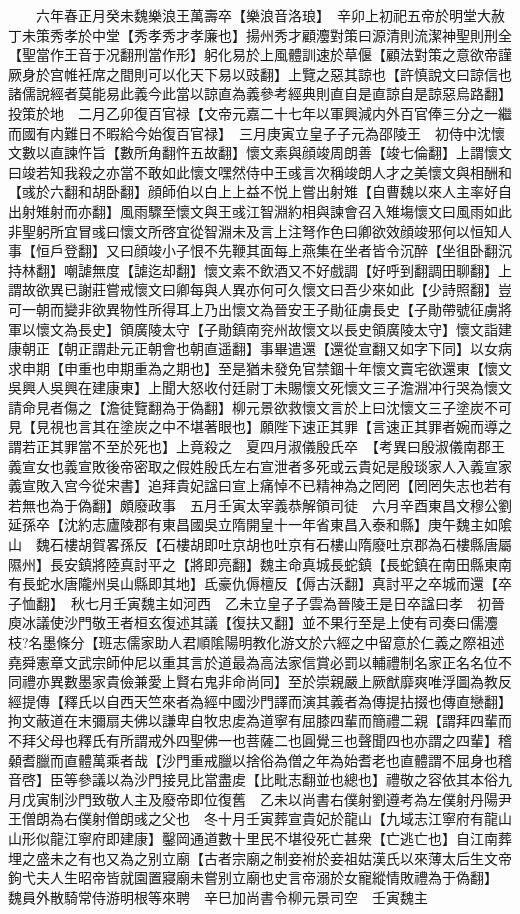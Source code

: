 　　六年春正月癸未魏樂浪王萬壽卒【樂浪音洛琅】　辛卯上初祀五帝於明堂大赦　丁未策秀孝於中堂【秀孝秀才孝廉也】揚州秀才顧灋對策曰源清則流潔神聖則刑全【聖當作王音于况翻刑當作形】躬化易於上風體訓速於草偃【顧法對策之意欲帝謹厥身於宫帷衽席之間則可以化天下易以豉翻】上覽之惡其諒也【許慎說文曰諒信也諸儒說經者莫能易此義今此當以諒直為義參考經典則直自是直諒自是諒惡烏路翻】投策於地　二月乙卯復百官禄【文帝元嘉二十七年以軍興減内外百官俸三分之一繼而國有内難日不暇給今始復百官禄】　三月庚寅立皇子子元為邵陵王　初侍中沈懷文數以直諫忤旨【數所角翻忤五故翻】懷文素與顔竣周朗善【竣七倫翻】上謂懷文曰竣若知我殺之亦當不敢如此懷文嘿然侍中王彧言次稱竣朗人才之美懷文與相酬和【彧於六翻和胡卧翻】顔師伯以白上上益不悦上嘗出射雉【自曹魏以來人主率好自出射雉射而亦翻】風雨驟至懷文與王彧江智淵約相與諫會召入雉塲懷文曰風雨如此非聖躬所宜冒彧曰懷文所啓宜從智淵未及言上注弩作色曰卿欲效顔竣邪何以恒知人事【恒戶登翻】又曰顔竣小子恨不先鞭其面每上燕集在坐者皆令沉醉【坐徂卧翻沉持林翻】嘲謔無度【謔迄却翻】懷文素不飲酒又不好戲調【好呼到翻調田聊翻】上謂故欲異已謝莊嘗戒懷文曰卿每與人異亦何可久懷文曰吾少來如此【少詩照翻】豈可一朝而變非欲異物性所得耳上乃出懷文為晉安王子勛征虜長史【子勛帶號征虜將軍以懷文為長史】領廣陵太守【子勛鎮南兖州故懷文以長史領廣陵太守】懷文詣建康朝正【朝正謂赴元正朝會也朝直遥翻】事畢遣還【還從宣翻又如字下同】以女病求申期【申重也申期重為之期也】至是猶未發免官禁錮十年懷文賣宅欲還東【懷文吳興人吳興在建康東】上聞大怒收付廷尉丁未賜懷文死懷文三子澹淵冲行哭為懷文請命見者傷之【澹徒覽翻為于偽翻】柳元景欲救懷文言於上曰沈懷文三子塗炭不可見【見視也言其在塗炭之中不堪著眼也】願陛下速正其罪【言速正其罪者婉而導之謂若正其罪當不至於死也】上竟殺之　夏四月淑儀殷氏卒　【考異曰殷淑儀南郡王義宣女也義宣敗後帝密取之假姓殷氏左右宣泄者多死或云貴妃是殷琰家人入義宣家義宣敗入宫今從宋書】追拜貴妃諡曰宣上痛悼不已精神為之罔罔【罔罔失志也若有若無也為于偽翻】頗廢政事　五月壬寅太宰義恭解領司徒　六月辛酉東昌文穆公劉延孫卒【沈約志廬陵郡有東昌國吳立隋開皇十一年省東昌入泰和縣】庚午魏主如隂山　魏石樓胡賀畧孫反【石樓胡即吐京胡也吐京有石樓山隋廢吐京郡為石樓縣唐屬隰州】長安鎮將陸真討平之【將即亮翻】魏主命真城長蛇鎮【長蛇鎮在南田縣東南有長蛇水唐隴州吳山縣即其地】氐豪仇傉檀反【傉古沃翻】真討平之卒城而還【卒子恤翻】　秋七月壬寅魏主如河西　乙未立皇子子雲為晉陵王是日卒諡曰孝　初晉庾冰議使沙門敬王者桓玄復述其議【復扶又翻】並不果行至是上使有司奏曰儒灋枝?名墨條分【班志儒家助人君順隂陽明教化游文於六經之中留意於仁義之際祖述堯舜憲章文武宗師仲尼以重其言於道最為高法家信賞必罰以輔禮制名家正名名位不同禮亦異數墨家貴儉兼愛上賢右鬼非命尚同】至於崇親嚴上厥猷靡爽唯浮圖為教反經提傳【釋氏以自西天竺來者為經中國沙門譯而演其義者為傳提拈掇也傳直戀翻】拘文蔽道在末彌扇夫佛以謙卑自牧忠䖍為道寧有屈膝四輩而簡禮二親【謂拜四輩而不拜父母也釋氏有所謂戒外四聖佛一也菩薩二也圓覺三也聲聞四也亦謂之四輩】稽顙耆臘而直體萬乘者哉【沙門重戒臘以捨俗為僧之年為始耆老也直體謂不屈身也稽音啓】臣等參議以為沙門接見比當盡䖍【比毗志翻並也總也】禮敬之容依其本俗九月戊寅制沙門致敬人主及廢帝即位復舊　乙未以尚書右僕射劉遵考為左僕射丹陽尹王僧朗為右僕射僧朗彧之父也　冬十月壬寅葬宣貴妃於龍山【九域志江寧府有龍山山形似龍江寧府即建康】鑿岡通道數十里民不堪役死亡甚衆【亡逃亡也】自江南葬埋之盛未之有也又為之别立廟【古者宗廟之制妾袝於妾祖姑漢氏以來薄太后生文帝鉤弋夫人生昭帝皆就園置寢廟未嘗别立廟也史言帝溺於女寵縱情敗禮為于偽翻】　魏員外散騎常侍游明根等來聘　辛巳加尚書令柳元景司空　壬寅魏主